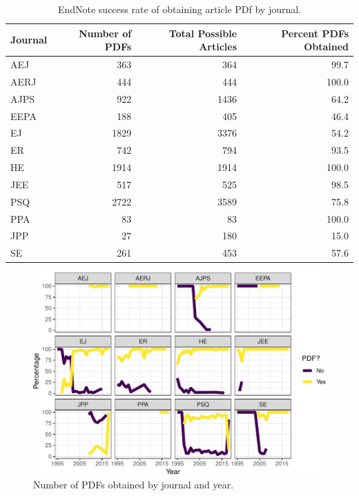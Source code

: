 \documentclass[english,,man]{apa6}
\theoremstyle{definition}
\theoremstyle{definition}
\theoremstyle{definition}
\theoremstyle{remark}
\begin{document}
\begin{table}[!h]

\caption{\label{tab:setup}EndNote success rate of obtaining article PDf by journal.}
\centering
\begin{tabular}[t]{lrrr}
\toprule
Journal & Number of PDFs & Total Possible Articles & Percent PDFs Obtained\\
\midrule
AEJ & 363 & 364 & 99.7\\
AERJ & 444 & 444 & 100.0\\
AJPS & 922 & 1436 & 64.2\\
EEPA & 188 & 405 & 46.4\\
EJ & 1829 & 3376 & 54.2\\
\addlinespace
ER & 742 & 794 & 93.5\\
HE & 1914 & 1914 & 100.0\\
JEE & 517 & 525 & 98.5\\
PSQ & 2722 & 3589 & 75.8\\
PPA & 83 & 83 & 100.0\\
\addlinespace
JPP & 27 & 180 & 15.0\\
SE & 261 & 453 & 57.6\\
\bottomrule
\end{tabular}
\end{table}

\begin{figure}
\centering
\includegraphics{software_files/figure-latex/pdf-time-1.pdf}
\caption{\label{fig:pdf-time}Number of PDFs obtained by journal and year.}
\end{figure}
\end{document}
